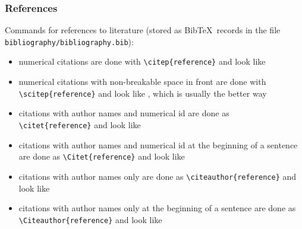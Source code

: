 \documentclass[mathserif]{beamer}%
\begin{document}
%
\begin{frame}%
\frametitle{References}%
Commands for references to literature (stored as Bib\TeX\ records in the file \texttt{bibliography/bibliography.bib}):%
\begin{itemize}%
\item\small numerical citations are done with \texttt{{\textbackslash}citep\{reference\}} and look like %
\item\small numerical citations with non-breakable space in front are done with \texttt{{\textbackslash}scitep\{reference\}} and look like , which is usually the better way%
\item\small citations with author names and numerical id are done as \texttt{{\textbackslash}citet\{reference\}} and look like %
\item\small citations with author names and numerical id at the beginning of a sentence are done as \texttt{{\textbackslash}Citet\{reference\}} and look like %
\item\small citations with author names only are done as \texttt{{\textbackslash}citeauthor\{reference\}} and look like %
\item\small citations with author names only at the beginning of a sentence are done as \texttt{{\textbackslash}Citeauthor\{reference\}} and look like %
\end{itemize}%
\end{frame}%
%
\endPresentation%
%
%
%
\end{document}
